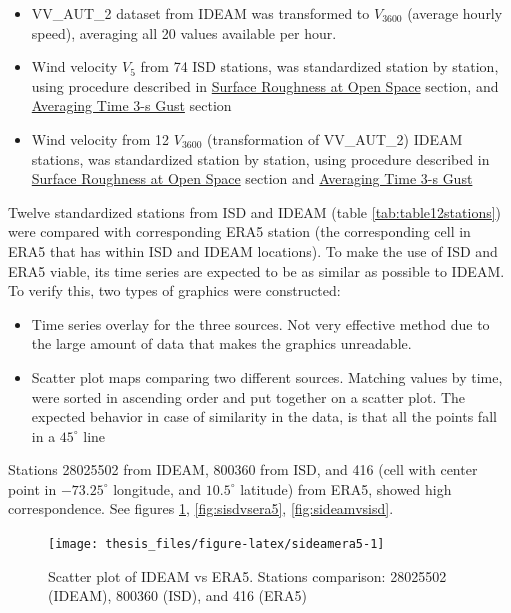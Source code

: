 \documentclass[12pt,oneside]{reedthesis}
\begin{document}
\endgroup{}
\begin{itemize}
\item
  VV\_AUT\_2 dataset from IDEAM was transformed to \(V_{3600}\) (average hourly speed), averaging all 20 values available per hour.
\item
  Wind velocity \(V_5\) from 74 ISD stations, was standardized station by station, using procedure described in \protect\hyperlink{rmd-roughness}{Surface Roughness at Open Space} section, and \protect\hyperlink{rmd-gust}{Averaging Time 3-s Gust} section
\item
  Wind velocity from 12 \(V_{3600}\) (transformation of VV\_AUT\_2) IDEAM stations, was standardized station by station, using procedure described in \protect\hyperlink{rmd-roughness}{Surface Roughness at Open Space} section and \protect\hyperlink{rmd-gust}{Averaging Time 3-s Gust}
\end{itemize}
Twelve standardized stations from ISD and IDEAM (table \ref{tab:table12stations}) were compared with corresponding ERA5 station (the corresponding cell in ERA5 that has within ISD and IDEAM locations). To make the use of ISD and ERA5 viable, its time series are expected to be as similar as possible to IDEAM. To verify this, two types of graphics were constructed:
\begin{itemize}
\item
  Time series overlay for the three sources. Not very effective method due to the large amount of data that makes the graphics unreadable.
\item
  Scatter plot maps comparing two different sources. Matching values by time, were sorted in ascending order and put together on a scatter plot. The expected behavior in case of similarity in the data, is that all the points fall in a \(45^\circ\) line
\end{itemize}
Stations 28025502 from IDEAM, 800360 from ISD, and 416 (cell with center point in \(-73.25^\circ\) longitude, and \(10.5^\circ\) latitude) from ERA5, showed high correspondence. See figures \ref{fig:sideamera5}, \ref{fig:sisdvsera5}, \ref{fig:sideamvsisd}.

\footnotesize
\begin{figure}

{\centering \texttt{[image: thesis\_files/figure-latex/sideamera5-1]} 

}

\caption{Scatter plot of IDEAM vs ERA5. Stations comparison: 28025502 (IDEAM), 800360 (ISD), and 416 (ERA5)}\label{fig:sideamera5}
\end{figure}
\normalsize
\end{document}
